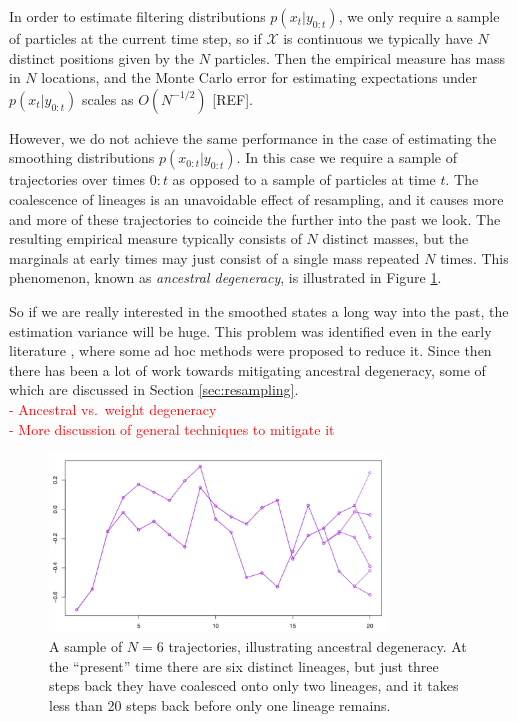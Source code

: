 \documentclass[fleqn]{article}
\begin{document}
In order to estimate filtering distributions $p(x_t | y_{0:t})$, we only require a sample of particles at the current time step, so if $\mathcal{X}$ is continuous we typically have $N$ distinct positions given by the $N$ particles. Then the empirical measure has mass in $N$ locations, and the Monte Carlo error for estimating expectations under $p(x_t | y_{0:t})$ scales as $O(N^{-1/2})$ [REF].

However, we do not achieve the same performance in the case of estimating the  smoothing distributions $p(x_{0:t} | y_{0:t})$. In this case we require a sample of trajectories over times $0:t$ as opposed to a sample of particles at time $t$.
The coalescence of lineages is an unavoidable effect of resampling, and it causes more and more of these trajectories to coincide the further into the past we look.
The resulting empirical measure typically consists of $N$ distinct masses, but the marginals at early times may just consist of a single mass repeated $N$ times.
This phenomenon, known as \emph{ancestral degeneracy}, is illustrated in Figure \ref{fig:degeneracy}.

So if we are really interested in the smoothed states a long way into the past, the estimation variance will be huge. This problem was identified even in the early literature \citep{gordon1993}, where some ad hoc methods were proposed to reduce it. Since then there has been a lot of work towards mitigating ancestral degeneracy, some of which are discussed in Section \ref{sec:resampling}.\\
\textcolor{red}{
- Ancestral vs.\ weight degeneracy\\
- More discussion of general techniques to mitigate it
}\\

\begin{figure}
\centering
\includegraphics[width=0.8\textwidth]{degeneracy.pdf}
\caption{A sample of $N=6$ trajectories, illustrating ancestral degeneracy. At the ``present'' time there are six distinct lineages, but just three steps back they have coalesced onto only two lineages, and it takes less than 20 steps back before only one lineage remains.}
\label{fig:degeneracy}
\end{figure}
\end{document}
